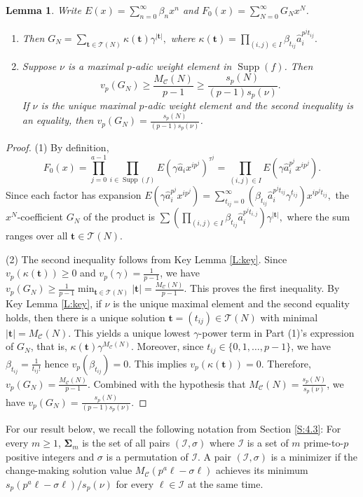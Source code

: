 \documentclass{amsart}
\numberwithin{equation}{section}
\newcommand{\cT}{\mathcal{T}}
\newcommand{\bSig}{\mathbf\Sigma}
\newcommand{\cC}{\mathcal{C}}
\newcommand{\cI}{\mathcal{I}}
\newcommand{\bt}{\mathbf{t}}
\DeclareMathOperator{\Supp}{Supp}
\theoremstyle{plain}
\newtheorem{lemma}[theorem]{Lemma}
\theoremstyle{definition}
\begin{document}
\begin{lemma}
\label{L:G_N1}
Write
$E(x)=\sum_{n=0}^{\infty} \beta_n x^n$ and 
$F_0(x)=\sum_{N=0}^{\infty} G_N x^N$.
\begin{enumerate}
\item Then 
$
G_N = \sum_{\bt \in \cT(N)}\kappa(\bt) \gamma^{|\bt|},
$
where 
$
\kappa(\bt)= \prod_{(i,j)\in I}\beta_{t_{ij}}\hat a_i^{p^j t_{ij}}.
$
\item Suppose $\nu$ is a maximal $p$-adic weight element in $\Supp(f)$.
Then 
$$v_p(G_N)
\ge \frac{M_\cC(N)}{p-1}
\ge \frac{s_p(N)}{(p-1)s_p(\nu)}.$$ 
If $\nu$ is the unique maximal $p$-adic weight element and the second inequality is an equality, then 
$v_p(G_N)=\frac{s_p(N)}{(p-1)s_p(\nu)}$.
\end{enumerate}

\end{lemma}

\begin{proof}
(1) By definition, 
\[
    F_0(x) = \prod_{j=0}^{a-1}\prod_{i\in\Supp(f)}
    E(\gamma \hat{a}_i x^{ip^j})^{\tau^j} =
    \prod_{(i,j)\in I} E(\gamma \hat a_i^{p^j} x^{ip^j}).
\]
Since each factor has expansion
$E(\gamma \hat a_i^{p^j} x^{ip^j})=
\sum_{t_{ij}=0}^{\infty} ( \beta_{t_{ij}}\hat a_i^{p^jt_{ij}}\gamma^{t_{ij}})x^{ip^jt_{ij}},
$
the $x^N$-coefficient $G_N$ of the product is
$
    \sum 
    \left( \prod_{(i,j) \in I} \beta_{t_{ij}}\hat a_i^{p^j t_{i,j}}\right)
    \gamma^{|\bt|},
$
where the sum ranges over all $\bt\in\cT(N)$. 

(2) The second inequality follows from Key Lemma \ref{L:key}.
Since $v_p(\kappa(\bt))\ge 0$ and $v_p(\gamma) = \frac{1}{p-1}$,
we have $v_p(G_N)\ge \frac{1}{p-1}\min_{\bt\in \cT(N)}|\bt|=\frac{M_{\cC}(N)}{p-1}$. This proves the first inequality. 
By Key Lemma \ref{L:key}, if $\nu$ is the unique maximal element
and the second equality holds, 
then there is a unique solution $\bt=(t_{ij})\in \cT(N)$ with minimal $|\bt|=M_\cC(N)$.
This yields a unique lowest $\gamma$-power term in Part (1)'s expression of $G_N$,
that is, $\kappa(\bt)\gamma^{M_{\cC}(N)}$. 
Moreover, since $t_{ij}\in\{0,1,\ldots,p-1\}$, we have $\beta_{t_{ij}}=\frac{1}{t_{ij}!}$ hence 
$v_p(\beta_{t_{ij}})=0$.
This implies $v_p(\kappa(\bt))=0$. Therefore,
$v_p(G_N)=\frac{M_\cC(N)}{p-1}$.
Combined with the hypothesis that $M_\cC(N)=\frac{s_p(N)}{s_p(\nu)}$, we have 
$v_p(G_N)=\frac{s_p(N)}{(p-1)s_p(\nu)}$.
\end{proof}


For our result below, we recall  the following notation from Section \ref{S:4.3}:
For every $m\ge 1$, $\bSig_m$ is the set of all pairs $(\cI, \sigma)$
where $\cI$ is a set of $m$ prime-to-$p$ positive integers and $\sigma$ 
is a permutation of $\cI$. A pair $(\cI,\sigma)$ is a minimizer if 
the change-making solution value 
$M_\cC(p^a\ell-\sigma\ell)$ achieves its minimum 
$s_p(p^a\ell-\sigma\ell)/s_p(\nu)$
for every $\ell\in \cI$ at the same time. 
\end{document}
